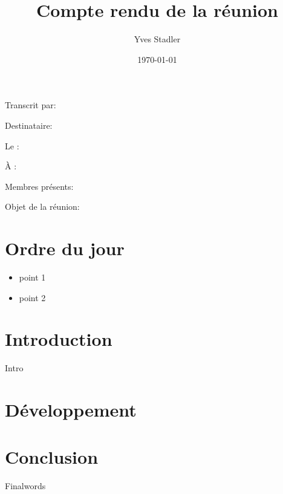 \documentclass[a4paper, 12pt, defaultorg]{organisation}
\title{Compte rendu de la réunion}
\author{Yves Stadler}
\date{\today}
\subtitle{\thesubject}
\begin{document}
\begin{shaded}
    \scriptsize
    \makeatletter
    Transcrit par: \@author{}

    Destinataire: \cr@recipient{}

    Le : \@date

    À : \cr@location

    Membres présents: \cr@people

    Objet de la réunion: \cr@subject
    \makeatother
\end{shaded}

\section*{Ordre du jour}
\begin{itemize}
    \item point 1
    \item point 2
\end{itemize}

\section{Introduction}

Intro

\section{Développement}
\lipsum

\section{Conclusion}
Finalwords
\end{document}
